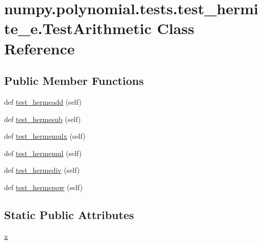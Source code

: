 \hypertarget{classnumpy_1_1polynomial_1_1tests_1_1test__hermite__e_1_1TestArithmetic}{}\section{numpy.\+polynomial.\+tests.\+test\+\_\+hermite\+\_\+e.\+Test\+Arithmetic Class Reference}
\label{classnumpy_1_1polynomial_1_1tests_1_1test__hermite__e_1_1TestArithmetic}
\subsection*{Public Member Functions}
\begin{DoxyCompactItemize}
\item 
def \hyperlink{classnumpy_1_1polynomial_1_1tests_1_1test__hermite__e_1_1TestArithmetic_ac9fdc4190def4c1db21284c887514cfe}{test\+\_\+hermeadd} (self)
\item 
def \hyperlink{classnumpy_1_1polynomial_1_1tests_1_1test__hermite__e_1_1TestArithmetic_ae10654ac0797680caf3fc8d7594321e8}{test\+\_\+hermesub} (self)
\item 
def \hyperlink{classnumpy_1_1polynomial_1_1tests_1_1test__hermite__e_1_1TestArithmetic_aaaaa8932387ec9fc0e8c88c62f96b22e}{test\+\_\+hermemulx} (self)
\item 
def \hyperlink{classnumpy_1_1polynomial_1_1tests_1_1test__hermite__e_1_1TestArithmetic_a8008c48f83d19ca751856940263f7f9d}{test\+\_\+hermemul} (self)
\item 
def \hyperlink{classnumpy_1_1polynomial_1_1tests_1_1test__hermite__e_1_1TestArithmetic_a9f28078c8aece6fc9ca8eeac573c7b8c}{test\+\_\+hermediv} (self)
\item 
def \hyperlink{classnumpy_1_1polynomial_1_1tests_1_1test__hermite__e_1_1TestArithmetic_a855feb3c6eec5854f4d98a491599ce69}{test\+\_\+hermepow} (self)
\end{DoxyCompactItemize}
\subsection*{Static Public Attributes}
\begin{DoxyCompactItemize}
\item 
\hyperlink{classnumpy_1_1polynomial_1_1tests_1_1test__hermite__e_1_1TestArithmetic_a346d0d8a6f7ab0eead1382f03f15ec30}{x}
\end{DoxyCompactItemize}



